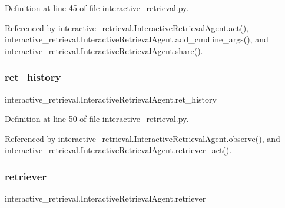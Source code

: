 Definition at line 45 of file interactive\+\_\+retrieval.\+py.



Referenced by interactive\+\_\+retrieval.\+Interactive\+Retrieval\+Agent.\+act(), interactive\+\_\+retrieval.\+Interactive\+Retrieval\+Agent.\+add\+\_\+cmdline\+\_\+args(), and interactive\+\_\+retrieval.\+Interactive\+Retrieval\+Agent.\+share().

\mbox{\label{classinteractive__retrieval_1_1InteractiveRetrievalAgent_a44261e1b26c611d0679ae8eea1b5dc60}} 
\subsubsection{\texorpdfstring{ret\+\_\+history}{ret\_history}}
{\footnotesize\ttfamily interactive\+\_\+retrieval.\+Interactive\+Retrieval\+Agent.\+ret\+\_\+history}



Definition at line 50 of file interactive\+\_\+retrieval.\+py.



Referenced by interactive\+\_\+retrieval.\+Interactive\+Retrieval\+Agent.\+observe(), and interactive\+\_\+retrieval.\+Interactive\+Retrieval\+Agent.\+retriever\+\_\+act().

\mbox{\label{classinteractive__retrieval_1_1InteractiveRetrievalAgent_abcebf849a73120e94a1848def5d2b70a}} 
\subsubsection{\texorpdfstring{retriever}{retriever}}
{\footnotesize\ttfamily interactive\+\_\+retrieval.\+Interactive\+Retrieval\+Agent.\+retriever}



